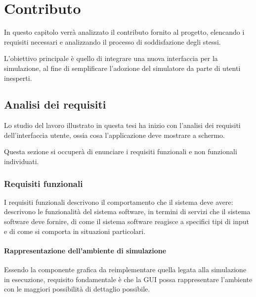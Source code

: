 

\chapter{Contributo}\label{ch:contributo}
    In questo capitolo verrà analizzato il contributo fornito al progetto, elencando i requisiti necessari e analizzando il processo di soddisfazione degli stessi.

    L'obiettivo principale è quello di integrare una nuova interfaccia per la simulazione, al fine di semplificare l’adozione del simulatore da parte di utenti inesperti.

    \section{Analisi dei requisiti}\label{sec:analisi}
        Lo studio del lavoro illustrato in questa tesi ha inizio con l'analisi dei requisiti dell’interfaccia utente, ossia cosa l'applicazione deve mostrare a schermo.

        Questa sezione si occuperà di enunciare i requisiti funzionali e non funzionali individuati.

        \subsection{Requisiti funzionali}\label{sub:funzionali}
            I requisiti funzionali descrivono il comportamento che il sistema deve avere:
            descrivono le funzionalità del sistema software, in termini di servizi che il sistema software deve fornire, di come il sistema software reagisce a specifici tipi di input e di come si comporta in situazioni particolari.

            \subsubsection{Rappresentazione dell'ambiente di simulazione}\label{subsub:seeEnv}
                Essendo la componente grafica da reimplementare quella legata alla simulazione in esecuzione, requisito fondamentale è che la GUI possa rappresentare l'ambiente con le maggiori possibilità di dettaglio possibile.

